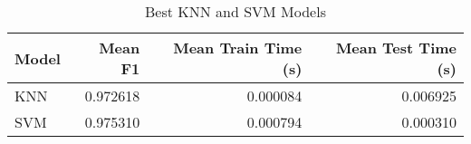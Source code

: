 \begin{table}
\centering
\caption{Best KNN and SVM Models}
\label{tab:best_knn_and_svm_summary_hepatitis}
\begin{tabular}{lrrr}
\toprule
Model & Mean F1 & Mean Train Time (s) & Mean Test Time (s) \\
\midrule
KNN & 0.972618 & 0.000084 & 0.006925 \\
SVM & 0.975310 & 0.000794 & 0.000310 \\
\bottomrule
\end{tabular}
\end{table}
